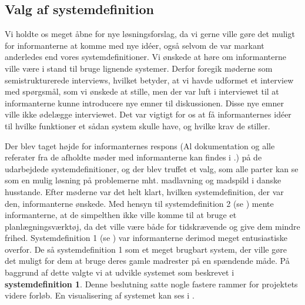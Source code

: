 \subsection{Valg af systemdefinition}
\label{subsec:valgafsystemdefinition}

Vi holdte os meget åbne for nye løsningsforslag, da vi gerne ville gøre det muligt for informanterne at komme med nye idéer, også selvom de var markant anderledes end vores systemdefinitioner. Vi ønskede at høre om informanterne ville være i stand til bruge lignende systemer. Derfor foregik møderne som semistrukturerede interviews, hvilket betyder, at vi havde udformet et interview med spørgsmål, som vi ønskede at stille, men der var luft i interviewet til at informanterne kunne introducere nye emner til diskussionen. Disse nye emner ville ikke ødelægge interviewet. Det var vigtigt for os at få informanternes idéer til hvilke funktioner et sådan system skulle have, og hvilke krav de stiller. 

Der blev taget højde for informanternes respons (Al dokumentation og alle referater fra de afholdte møder med informanterne kan findes i .) på de udarbejdede systemdefinitioner, og der blev truffet et valg, som alle parter kan se som en mulig løsning på problemerne mht. madlavning og madspild i danske husstande. Efter møderne var det helt klart, hvilken systemdefinition, der var den, informanterne ønskede. Med hensyn til systemdefinition 2 (se ) mente informanterne, at de simpelthen ikke ville komme til at bruge et planlægningsværktøj, da det ville være både for tidskrævende og give dem mindre frihed. Systemdefinition 1 (se ) var informanterne derimod meget entusiastiske overfor. De så systemdefinition 1 som et meget brugbart system, der ville gøre det muligt for dem at bruge deres gamle madrester på en spændende måde. På baggrund af dette valgte vi at udvikle systemet som beskrevet i \textbf{systemdefinition 1}. Denne beslutning satte nogle fastere rammer for projektets videre forløb. En visualisering af systemet kan ses i .

